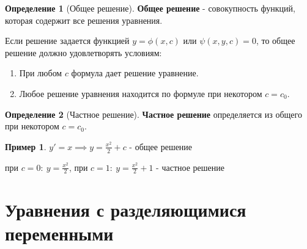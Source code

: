 \documentclass{report}
\theoremstyle{definition}
\newtheorem{definition}{Определение}[section]
\newtheorem{example}{Пример}
\begin{document}
\begin{definition}[Общее решение]
    \textbf{Общее решение} - совокупность функций, которая содержит все решения уравнения.

    Если решение задается функцией $y = \phi(x,c)$ или $\psi(x,y,c) = 0$, то общее решение должно удовлетворять условиям:
    \begin{enumerate}
        \item При любом $c$ формула дает решение уравнение.
        \item Любое решение уравнения находится по формуле при некотором $c = c_0$.
    \end{enumerate}
\end{definition}

\begin{definition}[Частное решение]
    \textbf{Частное решение} определяется из общего при некотором $c = c_0$.
\end{definition}

\begin{example}
    $y'=x \implies y = \frac{x^2}{2}+c$ - общее решение

    при $c=0: \ y = \frac{x^2}{2}$, при $c=1: \ y=\frac{x^2}{2} + 1$ - частное решение
\end{example}

\section{Уравнения с разделяющимися переменными}
\end{document}
